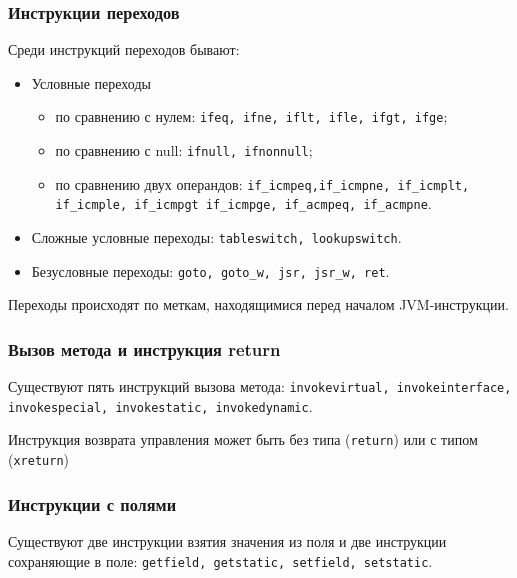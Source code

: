 \subsubsection*{Инструкции переходов}
Среди инструкций переходов бывают:
\begin{itemize}
\item Условные переходы
\begin{itemize}
\item по сравнению с нулем: \texttt{ifeq, ifne, iflt, ifle, ifgt, ifge};
\item по сравнению с null: \texttt{ifnull, ifnonnull};
\item по сравнению двух операндов: \texttt{if\_icmpeq,if\_icmpne, if\_icmplt, if\_icmple, if\_icmpgt if\_icmpge, if\_acmpeq, if\_acmpne}.
\end{itemize}
\item Сложные условные переходы: \texttt{tableswitch, lookupswitch}.
\item Безусловные переходы: \texttt{goto, goto\_w, jsr, jsr\_w, ret}.
\end{itemize}
Переходы происходят по меткам, находящимися перед началом JVM-инструкции.

\subsubsection*{Вызов метода и инструкция return}
Существуют пять инструкций вызова метода: \texttt{invokevirtual, invokeinterface, invokespecial, invokestatic, invokedynamic}.

Инструкция возврата управления может быть без типа (\texttt{return}) или с типом (\texttt{xreturn})
\subsubsection*{Инструкции с полями}
Существуют две инструкции взятия значения из поля и две инструкции сохраняющие в поле: \texttt{getfield, getstatic, setfield, setstatic}.
\newpage

